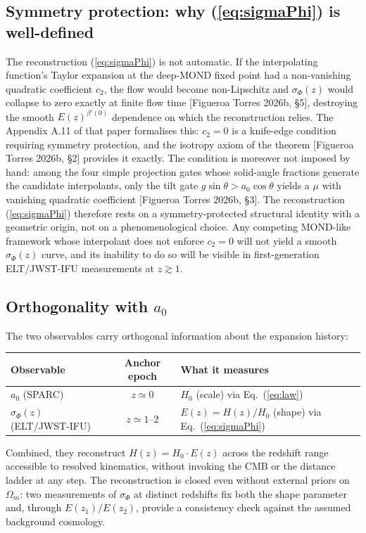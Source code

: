 \documentclass[11pt,a4paper]{article}
\begin{document}
\subsection*{Symmetry protection: why (\ref{eq:sigmaPhi}) is well-defined}

The reconstruction (\ref{eq:sigmaPhi}) is not automatic. If the interpolating
function's Taylor expansion at the deep-MOND fixed point had a non-vanishing
quadratic coefficient $c_2$, the flow would become non-Lipschitz and
$\sigma_\Phi(z)$ would collapse to zero exactly at finite flow time
[Figueroa Torres 2026b, \S5], destroying the smooth $E(z)^{\beta'(0)}$
dependence on which the reconstruction relies. The Appendix A.11 of that
paper formalises this: $c_2 = 0$ is a knife-edge condition requiring
symmetry protection, and the isotropy axiom of the theorem
[Figueroa Torres 2026b, \S2] provides it exactly. The condition is moreover
not imposed by hand: among the four simple projection gates whose
solid-angle fractions generate the candidate interpolants, only the tilt
gate $g\sin\theta > a_0\cos\theta$ yields a $\mu$ with vanishing quadratic
coefficient [Figueroa Torres 2026b, \S3]. The reconstruction
(\ref{eq:sigmaPhi}) therefore rests on a symmetry-protected structural
identity with a geometric origin, not on a phenomenological choice. Any competing MOND-like framework
whose interpolant does not enforce $c_2 = 0$ will not yield a smooth
$\sigma_\Phi(z)$ curve, and its inability to do so will be visible in
first-generation ELT/JWST-IFU measurements at $z \gtrsim 1$.

\subsection*{Orthogonality with $a_0$}

The two observables carry orthogonal information about the expansion
history:
\begin{center}
\begin{tabular}{lcl}
\toprule
Observable & Anchor epoch & What it measures \\
\midrule
$a_0$ (SPARC) & $z \simeq 0$ & $H_0$ (scale) via Eq.~(\ref{eq:law}) \\
$\sigma_\Phi(z)$ (ELT/JWST-IFU) & $z \simeq 1$--$2$ & $E(z) = H(z)/H_0$ (shape) via Eq.~(\ref{eq:sigmaPhi}) \\
\bottomrule
\end{tabular}
\end{center}
Combined, they reconstruct $H(z) = H_0 \cdot E(z)$ across the redshift range
accessible to resolved kinematics, without invoking the CMB or the distance
ladder at any step. The reconstruction is closed even without external
priors on $\Omega_m$: two measurements of $\sigma_\Phi$ at distinct
redshifts fix both the shape parameter and, through
$E(z_1)/E(z_2)$, provide a consistency check against the assumed background
cosmology.
\end{document}
